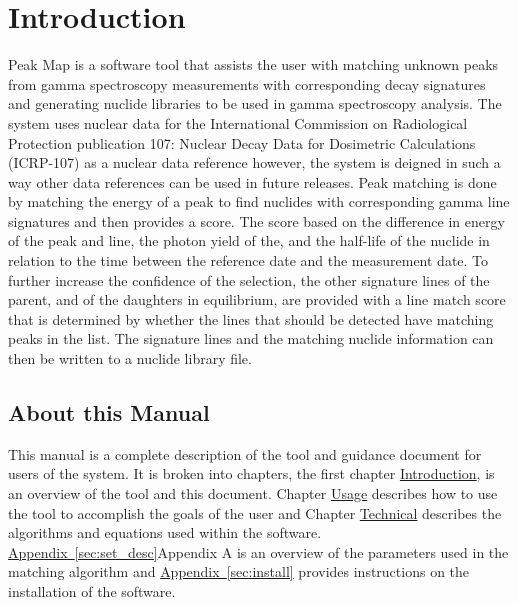 \documentclass[12pt,report,justified]{SANDreport}
\begin{document}
\chapter{Introduction}\label{sec:intro}
Peak Map is a software tool that assists the user with matching unknown peaks from gamma
spectroscopy measurements with corresponding decay signatures and generating nuclide libraries
to be used in gamma spectroscopy analysis. The system uses nuclear data for the International
Commission on Radiological Protection publication 107: Nuclear Decay Data for Dosimetric
Calculations (ICRP-107) as a nuclear data reference however, the system is deigned in such a way
other data references can be used in future releases. Peak matching is done by matching the energy
of a peak to find nuclides with corresponding gamma line signatures and then provides a score.
The score based on the difference in energy of the peak and line, the photon yield of the, and the
half-life of the nuclide in relation to the time between the reference date and the measurement date.
To further increase the confidence of the selection, the other signature lines of the parent, and of the
daughters in equilibrium, are provided with a line match score that is determined by whether the
lines that should be detected have matching peaks in the list. The signature lines and the matching
nuclide information can then be written to a nuclide library file.

\section{About this Manual}\label{sec:about}
This manual is a complete description of the tool and guidance document for users of the system. It
is broken into chapters, the first chapter \hyperref[sec:intro]{Introduction}, is an overview of the tool and this document.
Chapter \hyperref[sec:usage]{Usage} describes how to use the tool to accomplish the goals of the user and Chapter
\hyperref[sec:tech]{Technical} describes the algorithms and equations used within the software.
\hyperref[sec:set_desc]{Appendix~\ref{sec:set_desc}}Appendix A is an
overview of the parameters used in the matching algorithm and \hyperref[sec:install]{Appendix~\ref{sec:install}} provides instructions
on the installation of the software.
\end{document}

